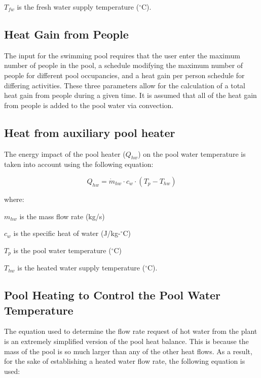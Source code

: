 \(T_{fw}\) is the fresh water supply temperature (\(^{\circ}\)C).

\subsection{Heat Gain from People}\label{heat-gain-from-people}

The input for the swimming pool requires that the user enter the maximum number of people in the pool, a schedule modifying the maximum number of people for different pool occupancies, and a heat gain per person schedule for differing activities. These three parameters allow for the calculation of a total heat gain from people during a given time. It is assumed that all of the heat gain from people is added to the pool water via convection.

\subsection{Heat from auxiliary pool heater}\label{heat-from-auxiliary-pool-heater}

The energy impact of the pool heater (\(Q_{hw}\)) on the pool water temperature is taken into account using the following equation:

\begin{equation}
Q_{hw} = \dot{m}_{hw} \cdot c_w \cdot (T_p - T_{hw})
\end{equation}

where:

\(m_{hw}\) is the mass flow rate (kg/s)

\(c_w\) is the specific heat of water (J/kg-\(^{\circ}\)C)

\(T_p\) is the pool water temperature (\(^{\circ}\)C)

\(T_{hw}\) is the heated water supply temperature (\(^{\circ}\)C).

\subsection{Pool Heating to Control the Pool Water Temperature}\label{pool-heating-to-control-the-pool-water-temperature}

The equation used to determine the flow rate request of hot water from the plant is an extremely simplified version of the pool heat balance. This is because the mass of the pool is so much larger than any of the other heat flows. As a result, for the sake of establishing a heated water flow rate, the following equation is used:


